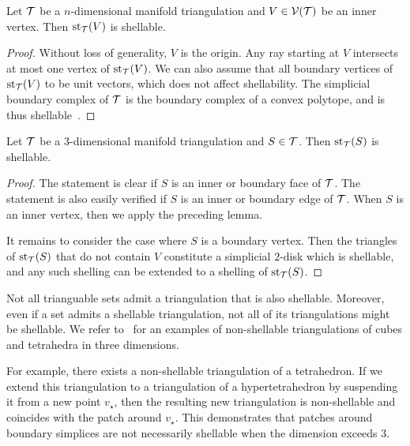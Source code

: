 \documentclass[a4paper]{article}
\begin{document}

\begin{lemma}
    Let ${\mathcal T}$ be a $n$-dimensional manifold triangulation and $V \in {\mathcal V}({\mathcal T})$ be an inner vertex.
    Then $\operatorname{st}_{{\mathcal T}}(V)$ is shellable. 
\end{lemma}
\begin{proof}
    Without loss of generality, $V$ is the origin. 
    Any ray starting at $V$ intersects at most one vertex of $\operatorname{st}_{{\mathcal T}}(V)$.
    We can also assume that all boundary vertices of $\operatorname{st}_{{\mathcal T}}(V)$ to be unit vectors,
    which does not affect shellability. 
    The simplicial boundary complex of ${\mathcal T}$ is the boundary complex of a convex polytope,
    and is thus shellable~\cite{ziegler2012lectures}. %
\end{proof}


\begin{lemma}
    Let ${\mathcal T}$ be a $3$-dimensional manifold triangulation and $S \in {\mathcal T}$.
    Then $\operatorname{st}_{{\mathcal T}}(S)$ is shellable. 
\end{lemma}
\begin{proof}
    The statement is clear if $S$ is an inner or boundary face of ${\mathcal T}$. 
    The statement is also easily verified if $S$ is an inner or boundary edge of ${\mathcal T}$.
    When $S$ is an inner vertex, then we apply the preceding lemma. 
    
    It remains to consider the case where $S$ is a boundary vertex. 
    Then the triangles of $\operatorname{st}_{{\mathcal T}}(S)$ that do not contain $V$ constitute a simplicial $2$-disk 
    which is shellable,
    and any such shelling can be extended to a shelling of $\operatorname{st}_{{\mathcal T}}(S)$.
\end{proof}


\begin{remark}
    Not all trianguable sets admit a triangulation that is also shellable. 
    Moreover, even if a set admits a shellable triangulation, not all of its triangulations might be shellable. 
    We refer to~\cite[Example 8.9]{ziegler2012lectures} for an examples of non-shellable triangulations of cubes and tetrahedra in three dimensions. 

    For example, there exists a non-shellable triangulation of a tetrahedron. 
    If we extend this triangulation to a triangulation of a hypertetrahedron by suspending it from a new point $v_\star$, 
    then the resulting new triangulation is non-shellable and coincides with the patch around $v_\star$.
    This demonstrates that patches around boundary simplices are not necessarily shellable when the dimension exceeds $3$.
\end{remark}
\end{document}
